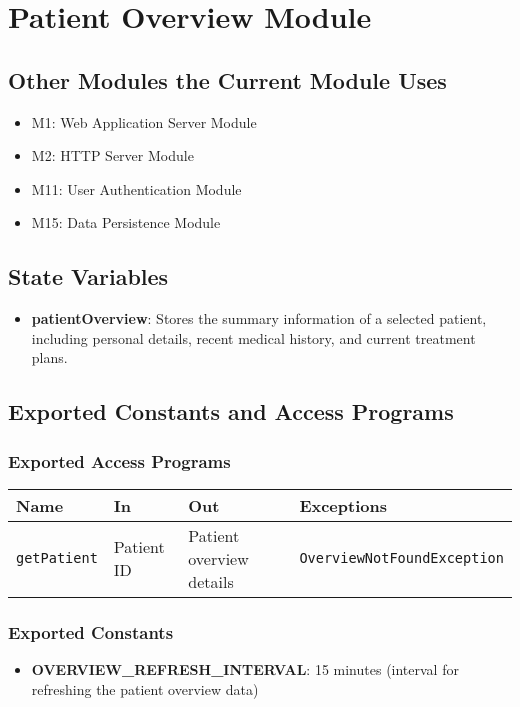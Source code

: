 \documentclass[12pt, titlepage]{article}
\begin{document}
\section{Patient Overview Module}

\subsection{Other Modules the Current Module Uses}
\begin{itemize}
\item M1: Web Application Server Module
\item M2: HTTP Server Module
\item M11: User Authentication Module
\item M15: Data Persistence Module
\end{itemize}

\subsection{State Variables}
\begin{itemize}
\item \textbf{patientOverview}: Stores the summary information of a selected patient, including personal details, recent medical history, and current treatment plans.
\end{itemize}

\subsection{Exported Constants and Access Programs}
\subsubsection{Exported Access Programs}
\begin{tabular}{|l|l|l|l|}
    \hline
    \textbf{Name} & \textbf{In} & \textbf{Out} & \textbf{Exceptions} \\
    \hline 
    \texttt{getPatient} & Patient ID & Patient overview details & \texttt{OverviewNotFoundException} \\
    \hline
\end{tabular}

\subsubsection{Exported Constants}
\begin{itemize}
\item \textbf{OVERVIEW\_REFRESH\_INTERVAL}: 15 minutes (interval for refreshing the patient overview data)
\end{itemize}
\end{document}
